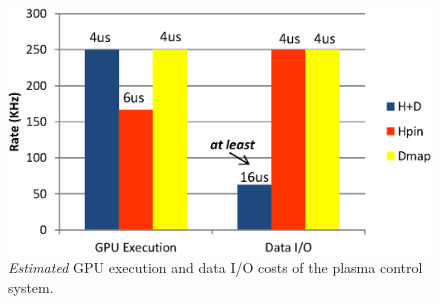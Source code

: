 \begin{figure}[t]
 \centering
 \includegraphics[width=\hsize]{eps/eval_plasma2.eps}
 \caption{\textit{Estimated} GPU execution and data I/O costs of
 the plasma control system.}
 \label{fig:eval_plasma}
\end{figure}

